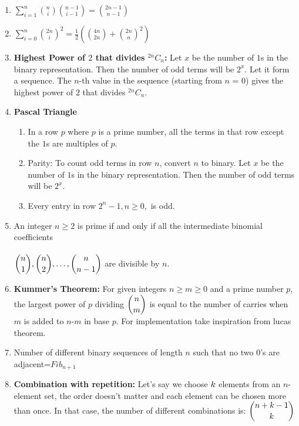 \begin{enumerate}
    \item $\displaystyle \sum \limits_{i=1}^n{n \choose i}{n-1 \choose i-1}={2n-1 \choose n-1}$
    \item $\displaystyle \sum \limits_{i=0}^n{2n \choose i}^2=\frac{1}{2} \left( {4n \choose 2n}+{2n \choose n}^2 \right)$
    \item \textbf{Highest Power of $\displaystyle 2$ that divides $^{2n}C_n$:}
    Let $\displaystyle x$ be the number of $\displaystyle 1$s in the binary representation. Then the number of odd terms will be $\displaystyle 2^x$. Let it form a sequence. The $n$-th value in the sequence (starting from $n$ = 0) gives the highest power of $\displaystyle 2$ that divides $^{2n}C_n$.
    \item \textbf{Pascal Triangle}
    \begin{enumerate}
        \item In a row $\displaystyle p$ where $\displaystyle p$ is a prime number, all the terms in that row except the $\displaystyle 1$s are multiples of $\displaystyle p$.
        \item Parity: To count odd terms in row $n$, convert $n$ to binary. Let $\displaystyle x$ be the number of $\displaystyle 1$s in the binary representation. Then the number of odd terms will be $\displaystyle 2^x$.
        \item Every entry in row $\displaystyle 2^n-1, n\geq 0,$ is odd.
    \end{enumerate}
    \item An integer $n\geq 2$ is prime if and only if all the intermediate binomial coefficients \\ \\  $\displaystyle \displaystyle {n \choose 1},{n \choose 2},\dots, {n \choose n-1}$ are divisible by $n$.
    \item \textbf{Kummer’s Theorem:} For given integers $n\geq m\geq 0$ and a prime number $\displaystyle p$, the largest power of $\displaystyle p$ dividing $\displaystyle \displaystyle {n \choose m}$ is equal to the number of carries when $m$ is added to $n$-$m$ in base $\displaystyle p$. For implementation take inspiration from lucas theorem.
    \item Number of different binary sequences of length $n$ such that no two $0$’s are adjacent=$\displaystyle Fib_{n+1}$
    \item \textbf{Combination with repetition:} Let’s say we choose $\displaystyle \displaystyle k$ elements from an $n$-element set, the order doesn’t matter and each element can be chosen more than once. In that case, the number of different combinations is: $\displaystyle \displaystyle {n+k-1 \choose k}$

\end{enumerate}
